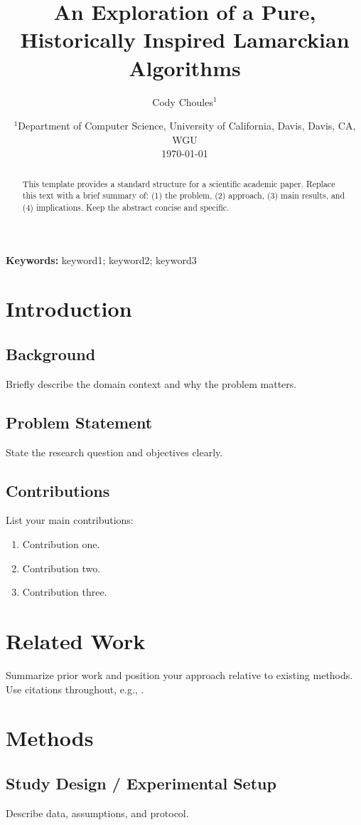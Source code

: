 \documentclass[11pt]{article}
\title{An Exploration of a Pure, Historically Inspired Lamarckian Algorithms}
\author{
    Cody Choules$^{1}$ 
}
\date{
    $^{1}$Department of Computer Science, University of California, Davis, Davis, CA, WGU\\
    \today
}
\begin{document}
\maketitle

\begin{abstract}
This template provides a standard structure for a scientific academic paper.
Replace this text with a brief summary of: (1) the problem, (2) approach,
(3) main results, and (4) implications. Keep the abstract concise and specific.
\end{abstract}

\noindent\textbf{Keywords:} keyword1; keyword2; keyword3

\section{Introduction}
\subsection{Background}
Briefly describe the domain context and why the problem matters.

\subsection{Problem Statement}
State the research question and objectives clearly.

\subsection{Contributions}
List your main contributions:
\begin{enumerate}[label=(\arabic*)]
    \item Contribution one.
    \item Contribution two.
    \item Contribution three.
\end{enumerate}

\section{Related Work}
Summarize prior work and position your approach relative to existing methods.
Use citations throughout, e.g., \cite{example2020}.

\section{Methods}
\subsection{Study Design / Experimental Setup}
Describe data, assumptions, and protocol.
\end{document}
